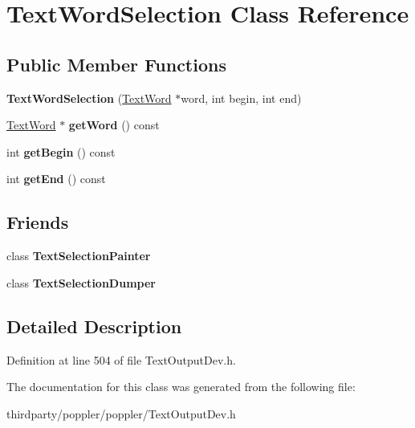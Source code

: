 \hypertarget{class_text_word_selection}{}\section{Text\+Word\+Selection Class Reference}
\label{class_text_word_selection}
\subsection*{Public Member Functions}
\begin{DoxyCompactItemize}
\item 
\mbox{\label{class_text_word_selection_a6565a2fbb5a69e85ed9c5e92584e0293}} 
{\bfseries Text\+Word\+Selection} (\hyperlink{class_text_word}{Text\+Word} $\ast$word, int begin, int end)
\item 
\mbox{\label{class_text_word_selection_ad0e855c6b70bfed030f66a74a11d6bf2}} 
\hyperlink{class_text_word}{Text\+Word} $\ast$ {\bfseries get\+Word} () const
\item 
\mbox{\label{class_text_word_selection_ae8b6293f757bf58fc07a297c9b158458}} 
int {\bfseries get\+Begin} () const
\item 
\mbox{\label{class_text_word_selection_a76d672178d415bc37aefe5859d3a55ee}} 
int {\bfseries get\+End} () const
\end{DoxyCompactItemize}
\subsection*{Friends}
\begin{DoxyCompactItemize}
\item 
\mbox{\label{class_text_word_selection_a478e1ac9857fe7ba0b2079ce49d24e78}} 
class {\bfseries Text\+Selection\+Painter}
\item 
\mbox{\label{class_text_word_selection_af2dbf093feb7a4386dbeeb5bf5423f29}} 
class {\bfseries Text\+Selection\+Dumper}
\end{DoxyCompactItemize}


\subsection{Detailed Description}


Definition at line 504 of file Text\+Output\+Dev.\+h.



The documentation for this class was generated from the following file\+:\begin{DoxyCompactItemize}
\item 
thirdparty/poppler/poppler/Text\+Output\+Dev.\+h\end{DoxyCompactItemize}
